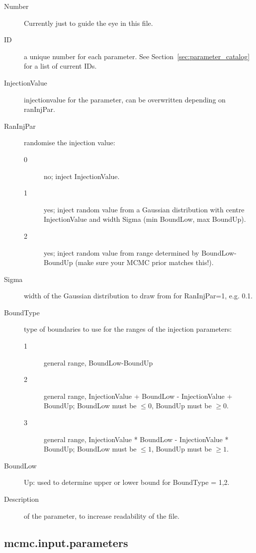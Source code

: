 \documentclass[10pt]{article}
\begin{document}
\begin{description}
\item[Number] Currently just to guide the eye in this file.
\item[ID] a unique number for each parameter.  See Section~\ref{sec:parameter_catalog} for a list of current IDs.
\item[InjectionValue] injectionvalue for the parameter, can be overwritten depending on ranInjPar.
\item[RanInjPar] randomise the injection value:
  \begin{description}
  \item[0] no; inject InjectionValue.
  \item[1] yes; inject random value from a Gaussian distribution with centre InjectionValue and width Sigma (min BoundLow, max BoundUp).
  \item[2] yes; inject random value from range determined by BoundLow-BoundUp (make sure your MCMC prior matches this!).
  \end{description}
\item[Sigma] width of the Gaussian distribution to draw from for RanInjPar=1, e.g. 0.1.

  
\item[BoundType] type of boundaries to use for the ranges of the injection parameters:
  \begin{description}
  \item[1] general range, BoundLow-BoundUp
  \item[2] general range, InjectionValue + BoundLow - InjectionValue + BoundUp; BoundLow must be $\leq 0$, BoundUp must be $\geq 0$.
  \item[3] general range, InjectionValue * BoundLow - InjectionValue * BoundUp; BoundLow must be $\leq 1$, BoundUp must be $\geq 1$.
  \end{description}
\item[BoundLow] Up: used to determine upper or lower bound for BoundType = 1,2.
\item[Description] of the parameter, to increase readability of the file.
\end{description}                


   






\pagebreak

\subsection{mcmc.input.parameters}
\end{document}
